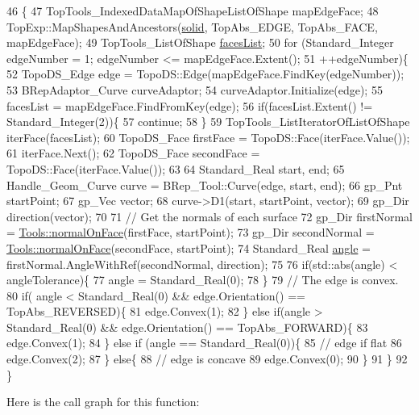 \begin{DoxyCode}
46                                                                                \{
47     TopTools\_IndexedDataMapOfShapeListOfShape mapEdgeFace;
48     TopExp::MapShapesAndAncestors(\hyperlink{classMcCAD_1_1Geometry_1_1Solid_1_1Impl_a279f71c11f2a7b285e3093879baf9362}{solid}, TopAbs\_EDGE, TopAbs\_FACE, mapEdgeFace);
49     TopTools\_ListOfShape \hyperlink{classMcCAD_1_1Geometry_1_1Solid_1_1Impl_a7127bb4d730197014b421e43ac19edfa}{facesList};
50     \textcolor{keywordflow}{for} (Standard\_Integer edgeNumber = 1; edgeNumber <= mapEdgeFace.Extent();
51          ++edgeNumber)\{
52         TopoDS\_Edge edge = TopoDS::Edge(mapEdgeFace.FindKey(edgeNumber));
53         BRepAdaptor\_Curve curveAdaptor;
54         curveAdaptor.Initialize(edge);
55         facesList = mapEdgeFace.FindFromKey(edge);
56         \textcolor{keywordflow}{if}(facesList.Extent() != Standard\_Integer(2))\{
57             \textcolor{keywordflow}{continue};
58         \}
59         TopTools\_ListIteratorOfListOfShape iterFace(facesList);
60         TopoDS\_Face firstFace = TopoDS::Face(iterFace.Value());
61         iterFace.Next();
62         TopoDS\_Face secondFace = TopoDS::Face(iterFace.Value());
63 
64         Standard\_Real start, end;
65         Handle\_Geom\_Curve curve = BRep\_Tool::Curve(edge, start, end);
66         gp\_Pnt startPoint;
67         gp\_Vec vector;
68         curve->D1(start, startPoint, vector);
69         gp\_Dir direction(vector);
70 
71         \textcolor{comment}{// Get the normals of each surface}
72         gp\_Dir firstNormal = \hyperlink{namespaceMcCAD_1_1Tools_a5e0090a8dd0489c030624ee30a098110}{Tools::normalOnFace}(firstFace, startPoint);
73         gp\_Dir secondNormal = \hyperlink{namespaceMcCAD_1_1Tools_a5e0090a8dd0489c030624ee30a098110}{Tools::normalOnFace}(secondFace, startPoint);
74         Standard\_Real \hyperlink{namespaceMcCAD_1_1Geometry_aa7ab15668cf6f88ba392926c3039d5e5}{angle} = firstNormal.AngleWithRef(secondNormal, direction);
75 
76         \textcolor{keywordflow}{if}(std::abs(angle) < angleTolerance)\{
77             angle = Standard\_Real(0);
78         \}
79         \textcolor{comment}{// The edge is convex.}
80         \textcolor{keywordflow}{if}( angle < Standard\_Real(0) && edge.Orientation() == TopAbs\_REVERSED)\{
81             edge.Convex(1);
82         \} \textcolor{keywordflow}{else} \textcolor{keywordflow}{if}(angle > Standard\_Real(0) && edge.Orientation() == TopAbs\_FORWARD)\{
83             edge.Convex(1);
84         \} \textcolor{keywordflow}{else} \textcolor{keywordflow}{if} (angle == Standard\_Real(0))\{
85             \textcolor{comment}{// edge if flat}
86             edge.Convex(2);
87         \} \textcolor{keywordflow}{else}\{
88             \textcolor{comment}{// edge is concave}
89             edge.Convex(0);
90         \}
91     \}
92 \}
\end{DoxyCode}
Here is the call graph for this function\+:


